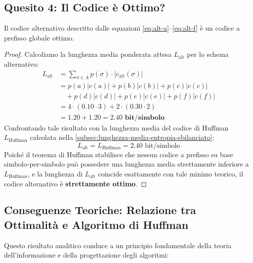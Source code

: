 \FloatBarrier
\subsection{Quesito 4: Il Codice \`e Ottimo?}
\label{subsec:quesito-4-ottimalita-codice}

\begin{theorem}
Il codice alternativo descritto dalle equazioni \eqref{eq:alt-a}--\eqref{eq:alt-f} \`e un codice a prefisso globale ottimo.
\end{theorem}

\begin{proof}
Calcoliamo la lunghezza media ponderata attesa $L_{\text{alt}}$ per lo schema alternativo:
\begin{align}
  L_{\text{alt}} &= \sum_{\sigma \in A} p(\sigma) \cdot |c_{\text{alt}}(\sigma)| \nonumber \\
                 &= p(a)|c(a)| + p(b)|c(b)| + p(c)|c(c)| \nonumber \\
                 &\quad + p(d)|c(d)| + p(e)|c(e)| + p(f)|c(f)| \nonumber \\
                 &= 4 \cdot (0.10 \cdot 3) + 2 \cdot (0.30 \cdot 2) \nonumber \\
                 &= 1.20 + 1.20 = \mathbf{2.40 \text{ bit/simbolo}}
\end{align}
Confrontando tale risultato con la lunghezza media del codice di Huffman $L_{\text{Huffman}}$ calcolata nella \autoref{subsec:lunghezza-media-entropia-sbilanciato}:
\begin{equation}
  L_{\text{alt}} = L_{\text{Huffman}} = 2.40 \text{ bit/simbolo}
\end{equation}
Poich\'e il teorema di Huffman stabilisce che nessun codice a prefisso su base simbolo-per-simbolo pu\`o possedere una lunghezza media strettamente inferiore a $L_{\text{Huffman}}$, e la lunghezza di $L_{\text{alt}}$ coincide esattamente con tale minimo teorico, il codice alternativo \`e \textbf{strettamente ottimo}.
\end{proof}

\FloatBarrier
\subsection{Conseguenze Teoriche: Relazione tra Ottimalit\`a e Algoritmo di Huffman}
\label{subsec:conseguenze-teoriche-ottimalita}

Questo risultato analitico conduce a un principio fondamentale della teoria dell'informazione e della progettazione degli algoritmi:


